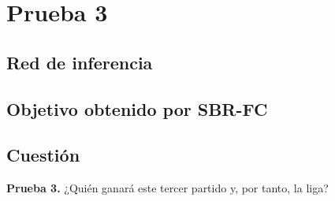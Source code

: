 

\section{Prueba 3}


\subsection{Red de inferencia}


\subsection{Objetivo obtenido por SBR-FC}

\subsection{Cuestión}
\begin{ejer}
	\textbf{Prueba 3.} ¿Quién ganará este tercer partido y, por tanto, la liga?
\end{ejer}